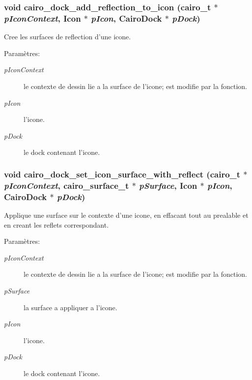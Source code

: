 \subsubsection{\setlength{\rightskip}{0pt plus 5cm}void cairo\_\-dock\_\-add\_\-reflection\_\-to\_\-icon (cairo\_\-t $\ast$ {\em p\-Icon\-Context}, {\bf Icon} $\ast$ {\em p\-Icon}, {\bf Cairo\-Dock} $\ast$ {\em p\-Dock})}\label{cairo-dock-applet-factory_8c_620ff5ba88d39637f6de466867424edd}


Cree les surfaces de reflection d'une icone. \begin{Desc}
\item[Param\`{e}tres:]
\begin{description}
\item[{\em p\-Icon\-Context}]le contexte de dessin lie a la surface de l'icone; est modifie par la fonction. \item[{\em p\-Icon}]l'icone. \item[{\em p\-Dock}]le dock contenant l'icone. \end{description}
\end{Desc}
\subsubsection{\setlength{\rightskip}{0pt plus 5cm}void cairo\_\-dock\_\-set\_\-icon\_\-surface\_\-with\_\-reflect (cairo\_\-t $\ast$ {\em p\-Icon\-Context}, cairo\_\-surface\_\-t $\ast$ {\em p\-Surface}, {\bf Icon} $\ast$ {\em p\-Icon}, {\bf Cairo\-Dock} $\ast$ {\em p\-Dock})}\label{cairo-dock-applet-factory_8c_27d7e4bfd22731afc1b86dea90d283a1}


Applique une surface sur le contexte d'une icone, en effacant tout au prealable et en creant les reflets correspondant. \begin{Desc}
\item[Param\`{e}tres:]
\begin{description}
\item[{\em p\-Icon\-Context}]le contexte de dessin lie a la surface de l'icone; est modifie par la fonction. \item[{\em p\-Surface}]la surface a appliquer a l'icone. \item[{\em p\-Icon}]l'icone. \item[{\em p\-Dock}]le dock contenant l'icone. \end{description}
\end{Desc}

